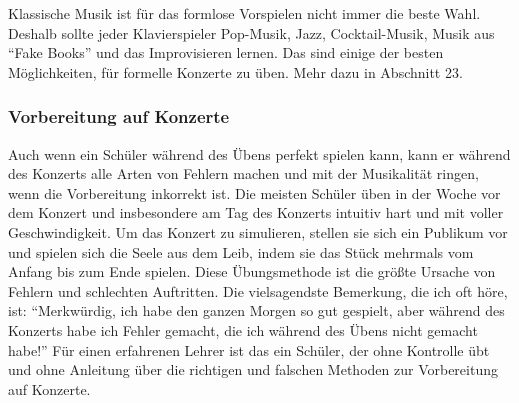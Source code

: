 Klassische Musik ist für das formlose Vorspielen nicht immer die beste Wahl.
Deshalb sollte jeder Klavierspieler Pop-Musik, Jazz, Cocktail-Musik, Musik aus \enquote{Fake Books} und das Improvisieren lernen.
Das sind einige der besten Möglichkeiten, für formelle Konzerte zu üben.
Mehr dazu in Abschnitt 23.


\subsubsection{Vorbereitung auf Konzerte}
\label{c1iii14f}

Auch wenn ein Schüler während des Übens perfekt spielen kann, kann er während des Konzerts alle Arten von Fehlern machen und mit der Musikalität ringen, wenn die Vorbereitung inkorrekt ist.
Die meisten Schüler üben in der Woche vor dem Konzert und insbesondere am Tag des Konzerts intuitiv hart und mit voller Geschwindigkeit.
Um das Konzert zu simulieren, stellen sie sich ein Publikum vor und spielen sich die Seele aus dem Leib, indem sie das Stück mehrmals vom Anfang bis zum Ende spielen.
Diese Übungsmethode ist die größte Ursache von Fehlern und schlechten Auftritten.
Die vielsagendste Bemerkung, die ich oft höre, ist: \enquote{Merkwürdig, ich habe den ganzen Morgen so gut gespielt, aber während des Konzerts habe ich Fehler gemacht, die ich während des Übens nicht gemacht habe!}
Für einen erfahrenen Lehrer ist das ein Schüler, der ohne Kontrolle übt und ohne Anleitung über die richtigen und falschen Methoden zur Vorbereitung auf Konzerte.

